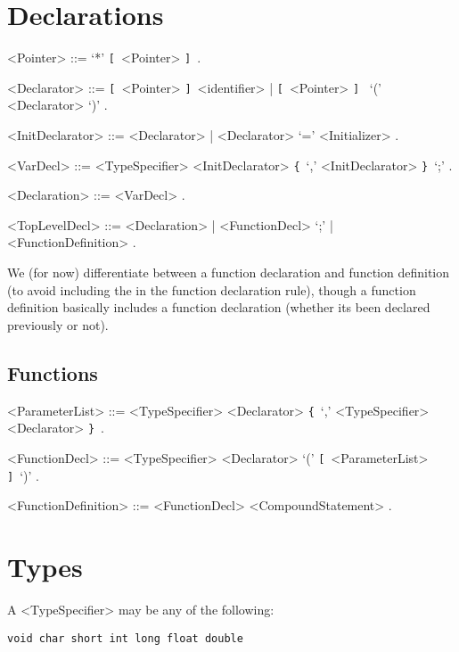 \documentclass{article}
\def\lrep{\synshortsoff\texttt{\{}\synshorts~}
\def\rrep{\synshortsoff\texttt{\}}\synshorts~}
\def\lopt{\synshortsoff\texttt{[}\synshorts~}
\def\ropt{\synshortsoff\texttt{]}\synshorts~}
\begin{document}
\section*{Declarations}
\begin{grammar}
  <Pointer> ::= `*' \lopt <Pointer> \ropt .
  
  <Declarator> ::= \lopt <Pointer> \ropt <identifier> | \lopt <Pointer> \ropt
  `(' <Declarator> `)' .
  
  <InitDeclarator> ::= <Declarator> | <Declarator> `=' <Initializer> .
  
  <VarDecl> ::= <TypeSpecifier> <InitDeclarator> \lrep `,' <InitDeclarator>
  \rrep `;' .
  
  <Declaration> ::= <VarDecl> .
  
  <TopLevelDecl> ::= <Declaration> | <FunctionDecl> `;' | <FunctionDefinition> .
\end{grammar}
We (for now) differentiate between a function declaration and function
definition (to avoid including the  in the function declaration rule),
though a function definition basically includes a function declaration (whether
its been declared previously or not).
\subsection*{Functions}
\begin{grammar}
  <ParameterList> ::= <TypeSpecifier> <Declarator> \lrep `,' <TypeSpecifier>
  <Declarator> \rrep .

  <FunctionDecl> ::= <TypeSpecifier> <Declarator> `(' \lopt <ParameterList>
  \ropt `)' .

  <FunctionDefinition> ::= <FunctionDecl> <CompoundStatement> .
\end{grammar}

\section*{Types}
A \synshorts <TypeSpecifier> \synshortsoff may be any of the following:
\begin{verbatim}
void char short int long float double
\end{verbatim}
\end{document}
